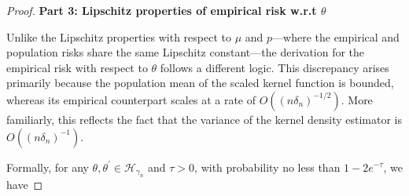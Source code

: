 \begin{proof}
\noindent \textbf{Part 3: Lipschitz properties of empirical risk w.r.t $\theta$}

\noindent Unlike the Lipschitz properties with respect to $\mu$ and $p$—where the empirical and population risks share the same Lipschitz constant—the derivation for the empirical risk with respect to $\theta$ follows a different logic. This discrepancy arises primarily because the population mean of the scaled kernel function is bounded, whereas its empirical counterpart scales at a rate of $O((n\delta_n)^{-1/2})$. More familiarly, this reflects the fact that the variance of the kernel density estimator is $O((n\delta_n)^{-1})$.

Formally, for any $\theta,\theta^\prime\in\mathcal{H}_{\gamma_n}$ and $\tau>0$, with probability no less than $1-2e^{-\tau}$, we have


\end{proof}
